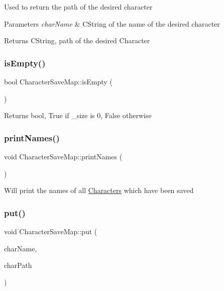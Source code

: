 Used to return the path of the desired character 
\begin{DoxyParams}{Parameters}
{\em char\+Name} & C\+String of the name of the desired character \\
\hline
\end{DoxyParams}
\begin{DoxyReturn}{Returns}
C\+String, path of the desired Character 
\end{DoxyReturn}
\hypertarget{class_character_save_map_ab184ee82d93d3e907a582f1924f05990}{}\label{class_character_save_map_ab184ee82d93d3e907a582f1924f05990} 
\subsubsection{\texorpdfstring{is\+Empty()}{isEmpty()}}
{\footnotesize\ttfamily bool Character\+Save\+Map\+::is\+Empty (\begin{DoxyParamCaption}{ }\end{DoxyParamCaption})}

\begin{DoxyReturn}{Returns}
bool, True if \+\_\+size is 0, False otherwise 
\end{DoxyReturn}
\hypertarget{class_character_save_map_a4e62aa81be98017382c268a2e1165f09}{}\label{class_character_save_map_a4e62aa81be98017382c268a2e1165f09} 
\subsubsection{\texorpdfstring{print\+Names()}{printNames()}}
{\footnotesize\ttfamily void Character\+Save\+Map\+::print\+Names (\begin{DoxyParamCaption}{ }\end{DoxyParamCaption})}

Will print the names of all \hyperlink{class_characters}{Characters} which have been saved \hypertarget{class_character_save_map_a1b0d8a748f717733e02ca01d2492fc80}{}\label{class_character_save_map_a1b0d8a748f717733e02ca01d2492fc80} 
\subsubsection{\texorpdfstring{put()}{put()}}
{\footnotesize\ttfamily void Character\+Save\+Map\+::put (\begin{DoxyParamCaption}\item[{const C\+String \&}]{char\+Name,  }\item[{const C\+String \&}]{char\+Path }\end{DoxyParamCaption})}


